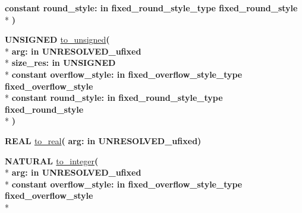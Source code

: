 \begin{DoxyCompactItemize}
{\bfseries {\bfseries \textcolor{keywordflow}{constant}\textcolor{vhdlchar}{ }}\textcolor{vhdlchar}{round\+\_\+style\+: }\textcolor{stringliteral}{in }\textcolor{vhdlchar}{fixed\+\_\+round\+\_\+style\+\_\+type     fixed\+\_\+round\+\_\+style}}\\*
{\bfseries  )} 
\item 
{\bfseries {\bfseries \textcolor{comment}{U\+N\+S\+I\+G\+N\+E\+D}\textcolor{vhdlchar}{ }}} \hyperlink{classfixed__pkg_aeb7963e65584583be9e6899d2b7887e6}{to\+\_\+unsigned}{\bfseries  ( }\\*
{\bfseries \textcolor{vhdlchar}{arg\+: }\textcolor{stringliteral}{in }\textcolor{vhdlchar}{U\+N\+R\+E\+S\+O\+L\+V\+E\+D\+\_\+ufixed}}\\*
{\bfseries \textcolor{vhdlchar}{size\+\_\+res\+: }\textcolor{stringliteral}{in }{\bfseries \textcolor{comment}{U\+N\+S\+I\+G\+N\+E\+D}\textcolor{vhdlchar}{ }}}\\*
{\bfseries {\bfseries \textcolor{keywordflow}{constant}\textcolor{vhdlchar}{ }}\textcolor{vhdlchar}{overflow\+\_\+style\+: }\textcolor{stringliteral}{in }\textcolor{vhdlchar}{fixed\+\_\+overflow\+\_\+style\+\_\+type     fixed\+\_\+overflow\+\_\+style}}\\*
{\bfseries {\bfseries \textcolor{keywordflow}{constant}\textcolor{vhdlchar}{ }}\textcolor{vhdlchar}{round\+\_\+style\+: }\textcolor{stringliteral}{in }\textcolor{vhdlchar}{fixed\+\_\+round\+\_\+style\+\_\+type     fixed\+\_\+round\+\_\+style}}\\*
{\bfseries  )} 
\item 
{\bfseries {\bfseries \textcolor{comment}{R\+E\+A\+L}\textcolor{vhdlchar}{ }}} \hyperlink{classfixed__pkg_a5a07993e8b679308d776fe3fd1b67eb7}{to\+\_\+real}{\bfseries  ( }{\bfseries \textcolor{vhdlchar}{arg\+: }\textcolor{stringliteral}{in }\textcolor{vhdlchar}{U\+N\+R\+E\+S\+O\+L\+V\+E\+D\+\_\+ufixed}}{\bfseries  )} 
\item 
{\bfseries {\bfseries \textcolor{comment}{N\+A\+T\+U\+R\+A\+L}\textcolor{vhdlchar}{ }}} \hyperlink{classfixed__pkg_a5198b212bc0f81a037389f568aefa7c6}{to\+\_\+integer}{\bfseries  ( }\\*
{\bfseries \textcolor{vhdlchar}{arg\+: }\textcolor{stringliteral}{in }\textcolor{vhdlchar}{U\+N\+R\+E\+S\+O\+L\+V\+E\+D\+\_\+ufixed}}\\*
{\bfseries {\bfseries \textcolor{keywordflow}{constant}\textcolor{vhdlchar}{ }}\textcolor{vhdlchar}{overflow\+\_\+style\+: }\textcolor{stringliteral}{in }\textcolor{vhdlchar}{fixed\+\_\+overflow\+\_\+style\+\_\+type     fixed\+\_\+overflow\+\_\+style}}\\*

\end{DoxyCompactItemize}
